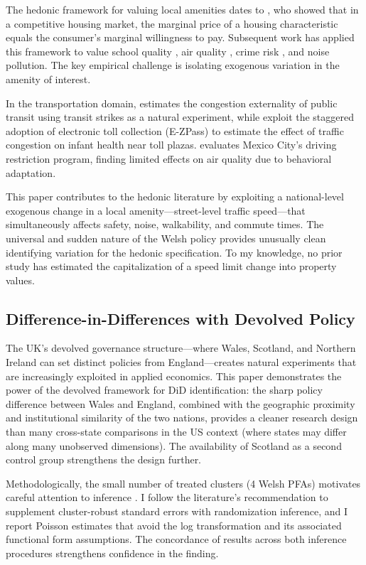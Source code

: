 \documentclass[12pt]{article}
\begin{document}
The hedonic framework for valuing local amenities dates to \citet{rosen1974}, who showed that in a competitive housing market, the marginal price of a housing characteristic equals the consumer's marginal willingness to pay. Subsequent work has applied this framework to value school quality \citep{black1999}, air quality \citep{chay2005}, crime risk \citep{linden2016, pope2008}, and noise pollution. The key empirical challenge is isolating exogenous variation in the amenity of interest.

In the transportation domain, \citet{anderson2014} estimates the congestion externality of public transit using transit strikes as a natural experiment, while \citet{currie2011} exploit the staggered adoption of electronic toll collection (E-ZPass) to estimate the effect of traffic congestion on infant health near toll plazas. \citet{davis2008} evaluates Mexico City's driving restriction program, finding limited effects on air quality due to behavioral adaptation.

This paper contributes to the hedonic literature by exploiting a national-level exogenous change in a local amenity---street-level traffic speed---that simultaneously affects safety, noise, walkability, and commute times. The universal and sudden nature of the Welsh policy provides unusually clean identifying variation for the hedonic specification. To my knowledge, no prior study has estimated the capitalization of a speed limit change into property values.

\subsection{Difference-in-Differences with Devolved Policy}

The UK's devolved governance structure---where Wales, Scotland, and Northern Ireland can set distinct policies from England---creates natural experiments that are increasingly exploited in applied economics. This paper demonstrates the power of the devolved framework for DiD identification: the sharp policy difference between Wales and England, combined with the geographic proximity and institutional similarity of the two nations, provides a cleaner research design than many cross-state comparisons in the US context (where states may differ along many unobserved dimensions). The availability of Scotland as a second control group strengthens the design further.

Methodologically, the small number of treated clusters (4 Welsh PFAs) motivates careful attention to inference \citep{cameron2008}. I follow the literature's recommendation to supplement cluster-robust standard errors with randomization inference, and I report Poisson estimates that avoid the log transformation and its associated functional form assumptions. The concordance of results across both inference procedures strengthens confidence in the finding.
\end{document}
